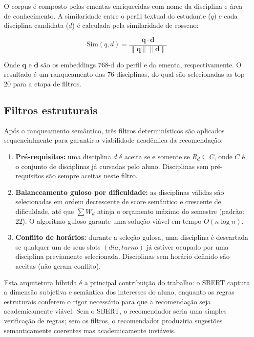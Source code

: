 \documentclass[12pt,a4paper]{article}
\begin{document}
O corpus é composto pelas ementas enriquecidas com nome da disciplina e área de conhecimento. A similaridade entre o perfil textual do estudante ($q$) e cada disciplina candidata ($d$) é calculada pela similaridade de cosseno:

\begin{equation}
    \text{Sim}(q, d) = \frac{\mathbf{q} \cdot \mathbf{d}}{\|\mathbf{q}\| \|\mathbf{d}\|}
\end{equation}

Onde $\mathbf{q}$ e $\mathbf{d}$ são os embeddings 768-d do perfil e da ementa, respectivamente. O resultado é um ranqueamento das 76 disciplinas, do qual são selecionadas as top-20 para a etapa de filtros.

\subsection{Filtros estruturais}

Após o ranqueamento semântico, três filtros determinísticos são aplicados sequencialmente para garantir a viabilidade acadêmica da recomendação:

\begin{enumerate}
    \item \textbf{Pré-requisitos:} uma disciplina $d$ é aceita se e somente se $R_d \subseteq C$, onde $C$ é o conjunto de disciplinas já cursadas pelo aluno. Disciplinas sem pré-requisitos são sempre aceitas neste filtro.
    \item \textbf{Balanceamento guloso por dificuldade:} as disciplinas válidas são selecionadas em ordem decrescente de score semântico e crescente de dificuldade, até que $\sum W_{d}$ atinja o orçamento máximo do semestre (padrão: 22). O algoritmo guloso garante uma solução viável em tempo $O(n \log n)$.
    \item \textbf{Conflito de horários:} durante a seleção gulosa, uma disciplina é descartada se qualquer um de seus slots $(dia, turno)$ já estiver ocupado por uma disciplina previamente selecionada. Disciplinas sem horário definido são aceitas (não geram conflito).
\end{enumerate}

Esta arquitetura híbrida é a principal contribuição do trabalho: o SBERT captura a dimensão subjetiva e semântica dos interesses do aluno, enquanto as regras estruturais conferem o rigor necessário para que a recomendação seja academicamente viável. Sem o SBERT, o recomendador seria uma simples verificação de regras; sem os filtros, o recomendador produziria sugestões semanticamente coerentes mas academicamente inviáveis.
\end{document}
